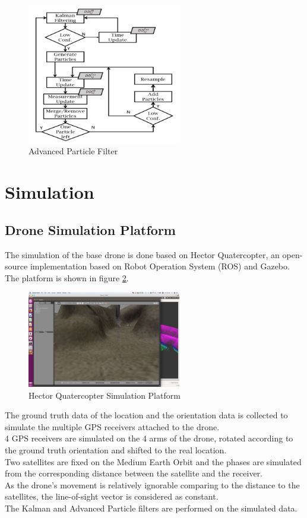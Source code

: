 \documentclass[journal,onecolumn]{IEEEtran}
\begin{document}
\begin{figure}
  \centering
  \captionsetup{justification=centering}
  \includegraphics[width=0.6\textwidth]{fig/APF.png}
  \caption{Advanced Particle Filter}
  \label{APF}
\end{figure}
\section{Simulation}
\subsection{Drone Simulation Platform}
The simulation of the base drone is done based on Hector Quatercopter, an open-source
implementation based on Robot Operation System (ROS) and Gazebo.
The platform is shown in figure \ref{hector}.\\
\begin{figure}
  \centering
  \captionsetup{justification=centering}
  \includegraphics[width=0.6\textwidth]{fig/hector.png}
  \caption{Hector Quatercopter Simulation Platform}
  \label{hector}
\end{figure}
The ground truth data of the location and the orientation data is collected to simulate the multiple GPS receivers attached to the drone.\\
4 GPS receivers are simulated on the 4 arms of the drone, rotated according to the ground truth orientation and shifted to the
real location.\\
Two satellites are fixed on the Medium Earth Orbit and the phases are simulated from the corresponding distance between the
satellite and the receiver.\\
As the drone’s movement is relatively ignorable comparing to the distance to the satellites, the line-of-sight vector is considered
as constant.\\
The Kalman and Advanced Particle filters are performed on the simulated data.\\
\end{document}
